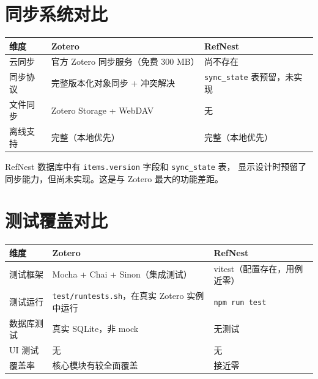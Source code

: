 \documentclass[12pt, a4paper]{article}
\begin{document}
\section{同步系统对比}

\begin{center}
\begin{tabular}{p{3.5cm} p{5cm} p{5cm}}
  \toprule
  \textbf{维度} & \textbf{Zotero} & \textbf{RefNest} \\
  \midrule
  云同步        & 官方 Zotero 同步服务（免费 300 MB） & 尚不存在 \\
  同步协议      & 完整版本化对象同步 + 冲突解决 & \texttt{sync\_state} 表预留，未实现 \\
  文件同步      & Zotero Storage + WebDAV & 无 \\
  离线支持      & 完整（本地优先） & 完整（本地优先） \\
  \bottomrule
\end{tabular}
\end{center}

RefNest 数据库中有 \texttt{items.version} 字段和 \texttt{sync\_state} 表，
显示设计时预留了同步能力，但尚未实现。这是与 Zotero 最大的功能差距。

\section{测试覆盖对比}

\begin{center}
\begin{tabular}{p{3.5cm} p{5cm} p{5cm}}
  \toprule
  \textbf{维度} & \textbf{Zotero} & \textbf{RefNest} \\
  \midrule
  测试框架      & Mocha + Chai + Sinon（集成测试） & vitest（配置存在，用例近零） \\
  测试运行      & \texttt{test/runtests.sh}，在真实 Zotero 实例中运行 & \texttt{npm run test} \\
  数据库测试    & 真实 SQLite，非 mock & 无测试 \\
  UI 测试       & 无 & 无 \\
  覆盖率        & 核心模块有较全面覆盖 & 接近零 \\
  \bottomrule
\end{tabular}
\end{center}
\end{document}
